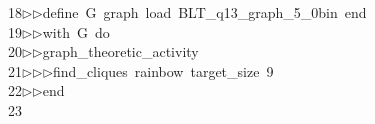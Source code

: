 \begin{tabbing}
18\>$\triangleright$\>$\triangleright$\>define\ G\ graph\ load\ BLT\_q13\_graph\_5\_0bin\ end\ \\[0pt]
19\>$\triangleright$\>$\triangleright$\>with\ G\ do\ \\[0pt]
20\>$\triangleright$\>$\triangleright$\>graph\_theoretic\_activity\ \\[0pt]
21\>$\triangleright$\>$\triangleright$\>$\triangleright$\>find\_cliques\ rainbow\ target\_size\ 9\ \\[0pt]
22\>$\triangleright$\>$\triangleright$\>end\\[0pt]
23\>\end{tabbing}
